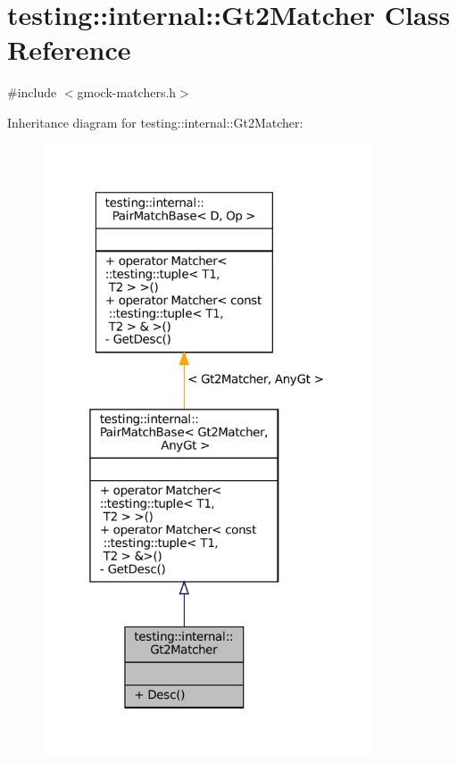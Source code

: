 \hypertarget{classtesting_1_1internal_1_1Gt2Matcher}{}\section{testing\+:\+:internal\+:\+:Gt2\+Matcher Class Reference}
\label{classtesting_1_1internal_1_1Gt2Matcher}


{\ttfamily \#include $<$gmock-\/matchers.\+h$>$}



Inheritance diagram for testing\+:\+:internal\+:\+:Gt2\+Matcher\+:
\nopagebreak
\begin{figure}[H]
\begin{center}
\leavevmode
\includegraphics[width=277pt]{classtesting_1_1internal_1_1Gt2Matcher__inherit__graph}
\end{center}
\end{figure}


